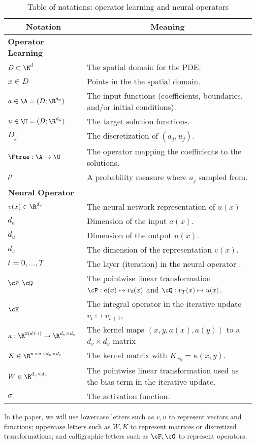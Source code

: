 \section{}
\label{sec:appendix_notation}

\begin{table}[ht]
\begin{center}
\begin{tabular}{|l|l|}
\multicolumn{1}{c}{\bf Notation} 
&\multicolumn{1}{c}{\bf Meaning}\\

\hline 
{\bf Operator Learning} &\\
$D \subset \R^d$  & The spatial domain for the PDE. \\
$x \in D$  & Points in the the spatial domain. \\
$a \in \A = (D;\R^{d_a})$  & The input functions (coefficients, boundaries, and/or initial conditions). \\
$u \in \U = (D;\R^{d_u})$  & The target solution functions. \\
$D_j$ & The discretization of $(a_j, u_j)$.\\
$\Ftrue: \A \to \U$  & The operator mapping the coefficients to the solutions.\\
$\mu$ & A probability measure where $a_j$ sampled from.\\
\hline
{\bf Neural Operator} &\\
$v(x) \in \R^{d_v}$  & The neural network representation of $u(x)$ \\
$d_a$ & Dimension of the input $a(x)$.\\
$d_u$ & Dimension of the output $u(x)$.\\
$d_v$ & The dimension of the representation $v(x)$.\\
$t = 0,\ldots,T$  & The layer (iteration) in the neural operator .\\
$\cP, \cQ$ & The pointwise linear transformation $\cP: a(x) \mapsto v_0(x)$ and $\cQ: v_T(x) \mapsto u(x)$. \\
$\cK$ & The integral operator in the iterative update $v_t \mapsto v_{t+1}$, \\
$\kappa : \R^{2(d+1)} \to \R^{d_v \times d_v}$  & The kernel maps $(x,y,a(x),a(y))$ to a $d_v \times d_v$ matrix\\
$K \in \R^{n \times n \times d_v \times d_v}$ & The kernel matrix with $K_{xy} = \kappa(x,y)$. \\
$W \in \R^{d_v \times d_v}$ & The pointwise linear transformation used as the bias term in the iterative update.\\
$\sigma $  & The activation function.  \\
\hline
\end{tabular}
\caption{Table of notations: operator learning and neural operators}
\label{table:notations1}
\small{In the paper, we will use lowercase letters such as $v, u$ to represent vectors and functions; uppercase letters such as $W, K$ to represent matrices or discretized transformations; and calligraphic letters such as $\cF, \cG$ to represent operators.
}
\end{center}
\end{table}


